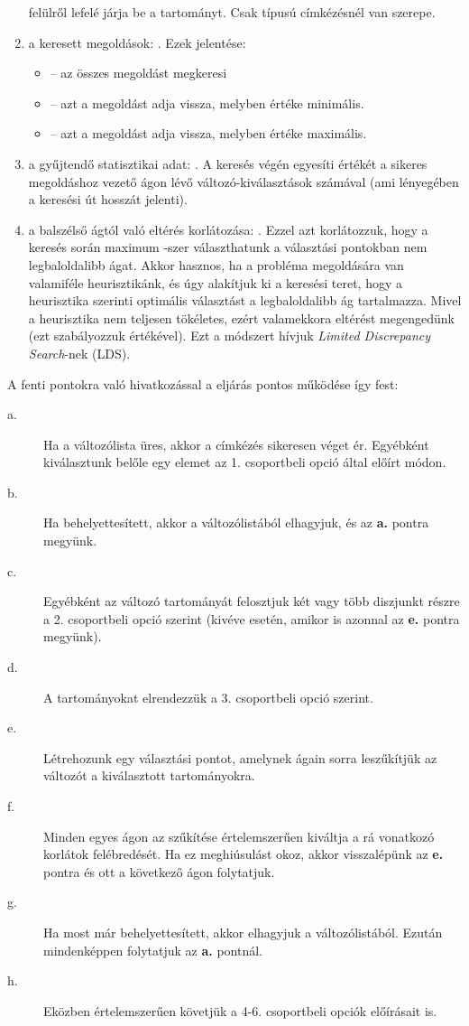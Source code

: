 \begin{enumerate}
 felülről lefelé járja be a tartományt. Csak  típusú
címkézésnél van szerepe.
\item a keresett megoldások: . Ezek jelentése:
	\begin{itemize}
	\item {} -- az összes megoldást megkeresi
	\item {} -- azt a megoldást adja vissza, melyben  értéke
	minimális.
	\item {} -- azt a megoldást adja vissza, melyben  értéke
	maximális.
	\end{itemize}
\item a gyűjtendő statisztikai adat: . A keresés végén egyesíti
 értékét a sikeres megoldáshoz vezető ágon lévő változó-kiválasztások
számával (ami lényegében a keresési út hosszát jelenti).
\item a balszélső ágtól való eltérés korlátozása: . Ezzel azt
korlátozzuk, hogy a keresés során maximum -szer választhatunk a választási
pontokban nem legbaloldalibb ágat. Akkor hasznos, ha a probléma megoldására van
valamiféle heurisztikánk, és úgy alakítjuk ki a keresési teret, hogy a heurisztika
szerinti optimális választást a legbaloldalibb ág tartalmazza. Mivel a heurisztika
nem teljesen tökéletes, ezért valamekkora eltérést megengedünk (ezt szabályozzuk
 értékével). Ezt a módszert hívjuk \emph{Limited Discrepancy Search}-nek (LDS).
\end{enumerate}

A fenti pontokra való hivatkozással a  eljárás pontos működése
így fest:

\label{labeling:lepesek}
\begin{description}
\item[a.]  Ha a változólista üres, akkor a címkézés sikeresen véget
ér. Egyébként kiválasztunk belőle egy  elemet az 1. csoportbeli opció
által előírt módon.
\item[b.] Ha  behelyettesített, akkor a változólistából elhagyjuk, és az
{\bf a.} pontra megyünk.
\item[c.] Egyébként az  változó tartományát felosztjuk két vagy több
diszjunkt részre a 2. csoportbeli opció szerint (kivéve 
esetén, amikor is azonnal az {\bf e.} pontra megyünk).
\item[d.] A tartományokat elrendezzük a 3. csoportbeli opció szerint.
\item[e.] Létrehozunk egy választási pontot, amelynek ágain sorra
leszűkítjük az  változót a kiválasztott tartományokra.
\item[f.] Minden egyes ágon az  szűkítése értelemszerűen kiváltja a
rá vonatkozó korlátok felébredését. Ha ez meghiúsulást okoz, akkor
visszalépünk az {\bf e.} pontra és ott a következő ágon folytatjuk.
\item[g.] Ha  most már behelyettesített, akkor elhagyjuk a változólistából.
Ezután mindenképpen folytatjuk az {\bf a.} pontnál.
\item[h.] Eközben értelemszerűen követjük a 4-6. csoportbeli opciók előírásait is.
\end{description}

